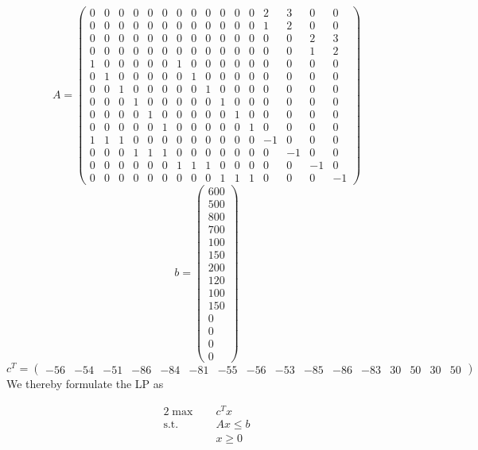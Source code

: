 \documentclass{assignment}
\begin{document}
$$A = \left(\begin{array}{cccccccccccccccc} 0 & 0 & 0 & 0 & 0 & 0 & 0 & 0 & 0 & 0 & 0 & 0 & 2 & 3 & 0 & 0\\ 0 & 0 & 0 & 0 & 0 & 0 & 0 & 0 & 0 & 0 & 0 & 0 & 1 & 2 & 0 & 0\\ 0 & 0 & 0 & 0 & 0 & 0 & 0 & 0 & 0 & 0 & 0 & 0 & 0 & 0 & 2 & 3\\ 0 & 0 & 0 & 0 & 0 & 0 & 0 & 0 & 0 & 0 & 0 & 0 & 0 & 0 & 1 & 2\\ 1 & 0 & 0 & 0 & 0 & 0 & 1 & 0 & 0 & 0 & 0 & 0 & 0 & 0 & 0 & 0\\ 0 & 1 & 0 & 0 & 0 & 0 & 0 & 1 & 0 & 0 & 0 & 0 & 0 & 0 & 0 & 0\\ 0 & 0 & 1 & 0 & 0 & 0 & 0 & 0 & 1 & 0 & 0 & 0 & 0 & 0 & 0 & 0\\ 0 & 0 & 0 & 1 & 0 & 0 & 0 & 0 & 0 & 1 & 0 & 0 & 0 & 0 & 0 & 0\\ 0 & 0 & 0 & 0 & 1 & 0 & 0 & 0 & 0 & 0 & 1 & 0 & 0 & 0 & 0 & 0\\ 0 & 0 & 0 & 0 & 0 & 1 & 0 & 0 & 0 & 0 & 0 & 1 & 0 & 0 & 0 & 0\\ 1 & 1 & 1 & 0 & 0 & 0 & 0 & 0 & 0 & 0 & 0 & 0 & -1 & 0 & 0 & 0\\ 0 & 0 & 0 & 1 & 1 & 1 & 0 & 0 & 0 & 0 & 0 & 0 & 0 & -1 & 0 & 0\\ 0 & 0 & 0 & 0 & 0 & 0 & 1 & 1 & 1 & 0 & 0 & 0 & 0 & 0 & -1 & 0\\ 0 & 0 & 0 & 0 & 0 & 0 & 0 & 0 & 0 & 1 & 1 & 1 & 0 & 0 & 0 & -1 \end{array}\right)$$
$$b = \left(\begin{array}{c} 600\\ 500\\ 800\\ 700\\ 100\\ 150\\ 200\\ 120\\ 100\\ 150\\ 0\\ 0\\ 0\\ 0 \end{array}\right)$$
$$c^T = \left(\begin{array}{cccccccccccccccc} -56 & -54 & -51 & -86 & -84 & -81 & -55 & -56 & -53 & -85 & -86 & -83 & 30 & 50 & 30 & 50 \end{array}\right)$$
We thereby formulate the LP as 


\begin{alignat*}{2}
\max        \quad & c^T x \\
\text{s.t.} \quad & Ax \leq b \\
                  & x \geq 0
\end{alignat*}
\end{document}
